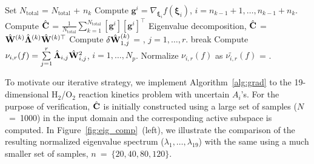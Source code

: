 \begin{breakablealgorithm}
\begin{algorithmic}[1]
		\State Set $N_\text{total}$ = $N_\text{total}$ + $n_k$ 
		\State Compute $\bm{g}^i = \nabla_{\bm{\xi}_i}f(\bm{\xi}_i)$, 
             	$i=n_{k-1}+1, \ldots, n_{k-1}+n_k$.  
		\State Compute $\hat{\mathbf{{C}}}$ = 
        	$\frac{1}{N_\text{total}}\sum\limits_{k=1}^{N_\text{total}}[\bm{g}^i][\bm{g}^i]^\top$
		\State Eigenvalue decomposition, $\hat{\mathbf{{C}}}$ = $\hat{\mathbf{{W}}}^{(k)}\hat{\mathbf{{\Lambda}}}^{(k)}
		 \hat{\mathbf{{W}}}^{(k)\top}$
		\State Compute $\delta \hat{\mathbf{{W}}}_{1,j}^{(k)}$ = 
                       , 
                       $j = 1,\ldots,r$.
			\State break
		\EndIf
	\EndLoop
	\State Compute $\nu_{i,r}(f) = \sum\limits_{j=1}^{r} \hat{\mathbf{{\Lambda}}}_{i,j}\hat{\mathbf{{W}}}_{i,j}^2$,
	$i=1,\ldots,N_p$.
	\State Normalize $\nu_{i,r}(f)$ as $\tilde{\nu_{i,r}}(f)$ = .
	
    \EndProcedure
  \end{algorithmic}
  \label{alg:grad}
\end{breakablealgorithm}
\bigskip

To motivate our iterative strategy, we implement
Algorithm~\ref{alg:grad} to the 19-dimensional H$_2$/O$_2$ reaction kinetics
problem with uncertain $A_i$'s. For the purpose of verification,
$\hat{\mathbf{{C}}}$ is initially constructed using a large set of samples
($N$~=~1000) in the input domain and the corresponding active subspace is
computed. In Figure~\ref{fig:eig_comp}~(left), we illustrate the comparison of
the resulting normalized eigenvalue spectrum ($\lambda_1, \ldots, 
\lambda_{19}$) with the same using a much 
smaller set of samples, $n$~=~$\{20,40,80,120\}$.



